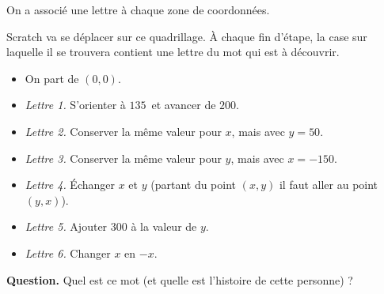\documentclass[class=report,crop=false, 12pt]{standalone}
\begin{document}
\begin{enigme}


On a associé une lettre à chaque zone de coordonnées.



Scratch va se déplacer sur ce quadrillage. À chaque fin d'étape, la case sur laquelle il se trouvera contient une lettre du mot qui est à découvrir.

\begin{itemize}
  \item On part de $(0,0)$.
  \item \emph{Lettre 1.} S'orienter à $135$\textdegree\ et avancer de $200$.
  \item \emph{Lettre 2.} Conserver la même valeur pour $x$, mais avec $y=50$.
  \item \emph{Lettre 3.} Conserver la même valeur pour $y$, mais avec $x=-150$.
  \item \emph{Lettre 4.} Échanger $x$ et $y$ (partant du point $(x,y)$ il faut aller au point $(y,x)$).
  \item \emph{Lettre 5.} Ajouter $300$ à la valeur de $y$.
  \item \emph{Lettre 6.} Changer $x$ en $-x$.  
\end{itemize}


\bigskip

\textbf{Question.} Quel est ce mot (et quelle est l'histoire de cette personne) ?




\end{enigme}
\end{document}
